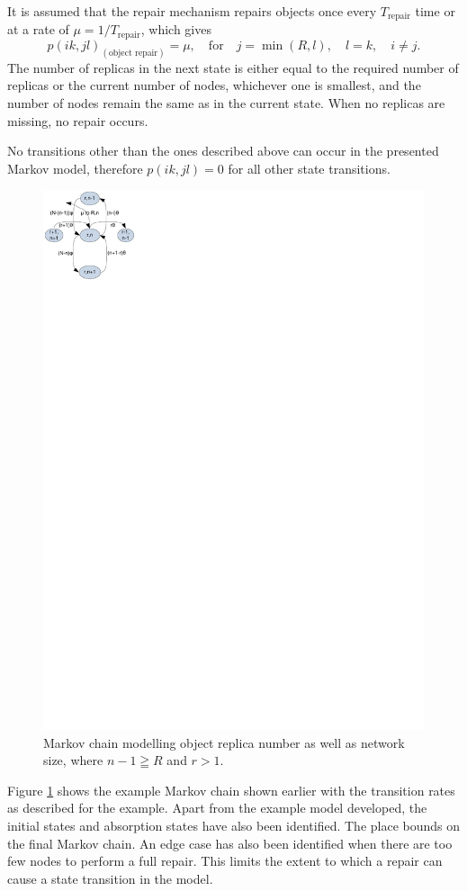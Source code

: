 \documentclass[10pt,a4paper,conference]{IEEEtran}
\begin{document}
It is assumed that the repair mechanism repairs objects once every $T_{\textrm{repair}}$ time or at a rate of $\mu = 1/T_{\textrm{repair}}$, which gives
%
\begin{equation} \label{eq_repair}
    p(i k,j l)_{(\textrm{object repair})} = \mu,\quad\textrm{for}\quad j = \min(R, l),\quad l = k,\quad i \neq j.
\end{equation}
%
The number of replicas in the next state is either equal to the required number of replicas or the current number of nodes, whichever one is smallest, and the number of nodes remain the same as in the current state. When no replicas are missing, no repair occurs.

No transitions other than the ones described above can occur in the presented Markov model, therefore $p(i k,j l) = 0$ for all other state transitions.

\begin{figure}[htbp]
 \centering
 \includegraphics[clip=true, viewport=0.0cm 24.5cm 5.0cm 30cm, width=0.6\columnwidth]{Markov_example}
 \caption{Markov chain modelling object replica number as well as network size, where $n-1\geqq R$ and $r > 1$.}
 \label{fig_markov_example}
\end{figure}
%
Figure \ref{fig_markov_example} shows the example Markov chain shown earlier with the transition rates as described for the example. Apart from the example model developed, the initial states and absorption states have also been identified. The place bounds on the final Markov chain. An edge case has also been identified when there are too few nodes to perform a full repair. This limits the extent to which a repair can cause a state transition in the model.
\end{document}

